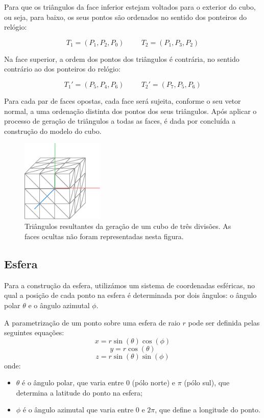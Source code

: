 \documentclass[12pt, a4paper]{article}
\begin{document}
Para que os triângulos da face inferior estejam voltados para o exterior do cubo, ou seja, para
baixo, os seus pontos são ordenados no sentido dos ponteiros do relógio:

$$
T_1 = (P_1, P_2, P_0)
\hspace{1cm}
T_2 = (P_1, P_3, P_2)
$$

Na face superior, a ordem dos pontos dos triângulos é contrária, no sentido contrário ao dos
ponteiros do relógio:

$$
T_1' = (P_5, P_4, P_6)
\hspace{1cm}
T_2' = (P_7, P_5, P_6)
$$

Para cada par de faces opostas, cada face será sujeita, conforme o seu vetor normal, a uma ordenação
distinta dos pontos dos seus triângulos. Após aplicar o processo de geração de triângulos a todas as
faces, é dada por concluída a construção do modelo do cubo.

\begin{figure}[H]
    \centering
    \includegraphics[width=0.35\textwidth]{res/figures/CubeTriangles.pdf}
    \caption{
        \onehalfspacing
        Triângulos resultantes da geração de um cubo de três divisões. As faces ocultas não foram
        representadas nesta figura.
    }
\end{figure}

\subsection{Esfera}

Para a construção da esfera, utilizámos um sistema de coordenadas esféricas,
no qual a posição de cada ponto na esfera é determinada por dois ângulos: o
ângulo polar \( \theta \) e o ângulo azimutal \( \phi \).

A parametrização de um ponto sobre uma esfera de raio \( r \) pode ser definida pelas seguintes
equações:
\[
x = r \sin(\theta) \cos(\phi)
\]
\[
y = r \cos(\theta)
\]
\[
z = r \sin(\theta) \sin(\phi)
\]
onde:
\begin{itemize}
\item \( \theta \) é o ângulo polar, que varia entre \( 0 \) (pólo norte) e \( \pi \)
(pólo sul), que determina a latitude do ponto na esfera;
\item \( \phi \) é o ângulo azimutal que varia entre \( 0 \) e \( 2\pi \), que define a
longitude do ponto.
\end{itemize}
\end{document}
